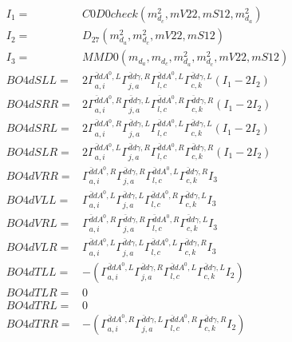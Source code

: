 \documentclass[A4,landscape]{article}
\begin{document}
\begin{align} 
I_1 = & C0D0check(m^2_{d_{{c}}}, mV22, mS12, m^2_{d_{{a}}}) \\ 
I_2 = & D_{27}(m^2_{d_{{a}}}, m^2_{d_{{c}}}, mV22, mS12) \\ 
I_3 = & MMD0(m_{d_{{a}}}, m_{d_{{c}}}, m^2_{d_{{a}}}, m^2_{d_{{c}}}, mV22, mS12) \\ 
  BO4dSLL= & 2  \Gamma^{\bar{d}d A^0 ,L}_{a, i} \Gamma^{\bar{d}d \gamma ,R}_{j, a} \Gamma^{\bar{d}d A^0 ,L}_{l, c} \Gamma^{\bar{d}d \gamma ,L}_{c, k} (I_1 - 2 I_2) \\ 
  BO4dSRR= & 2  \Gamma^{\bar{d}d A^0 ,R}_{a, i} \Gamma^{\bar{d}d \gamma ,L}_{j, a} \Gamma^{\bar{d}d A^0 ,R}_{l, c} \Gamma^{\bar{d}d \gamma ,R}_{c, k} (I_1 - 2 I_2) \\ 
  BO4dSRL= & 2  \Gamma^{\bar{d}d A^0 ,R}_{a, i} \Gamma^{\bar{d}d \gamma ,L}_{j, a} \Gamma^{\bar{d}d A^0 ,L}_{l, c} \Gamma^{\bar{d}d \gamma ,L}_{c, k} (I_1 - 2 I_2) \\ 
  BO4dSLR= & 2  \Gamma^{\bar{d}d A^0 ,L}_{a, i} \Gamma^{\bar{d}d \gamma ,R}_{j, a} \Gamma^{\bar{d}d A^0 ,R}_{l, c} \Gamma^{\bar{d}d \gamma ,R}_{c, k} (I_1 - 2 I_2) \\ 
  BO4dVRR= &  \Gamma^{\bar{d}d A^0 ,R}_{a, i} \Gamma^{\bar{d}d \gamma ,R}_{j, a} \Gamma^{\bar{d}d A^0 ,L}_{l, c} \Gamma^{\bar{d}d \gamma ,R}_{c, k} I_3 \\ 
  BO4dVLL= &  \Gamma^{\bar{d}d A^0 ,L}_{a, i} \Gamma^{\bar{d}d \gamma ,L}_{j, a} \Gamma^{\bar{d}d A^0 ,R}_{l, c} \Gamma^{\bar{d}d \gamma ,L}_{c, k} I_3 \\ 
  BO4dVRL= &  \Gamma^{\bar{d}d A^0 ,R}_{a, i} \Gamma^{\bar{d}d \gamma ,R}_{j, a} \Gamma^{\bar{d}d A^0 ,R}_{l, c} \Gamma^{\bar{d}d \gamma ,L}_{c, k} I_3 \\ 
  BO4dVLR= &  \Gamma^{\bar{d}d A^0 ,L}_{a, i} \Gamma^{\bar{d}d \gamma ,L}_{j, a} \Gamma^{\bar{d}d A^0 ,L}_{l, c} \Gamma^{\bar{d}d \gamma ,R}_{c, k} I_3 \\ 
  BO4dTLL= & -( \Gamma^{\bar{d}d A^0 ,L}_{a, i} \Gamma^{\bar{d}d \gamma ,R}_{j, a} \Gamma^{\bar{d}d A^0 ,L}_{l, c} \Gamma^{\bar{d}d \gamma ,L}_{c, k} I_2) \\ 
  BO4dTLR= & 0 \\ 
  BO4dTRL= & 0 \\ 
  BO4dTRR= & -( \Gamma^{\bar{d}d A^0 ,R}_{a, i} \Gamma^{\bar{d}d \gamma ,L}_{j, a} \Gamma^{\bar{d}d A^0 ,R}_{l, c} \Gamma^{\bar{d}d \gamma ,R}_{c, k} I_2) \\ 
\end{align} 
\end{document}
